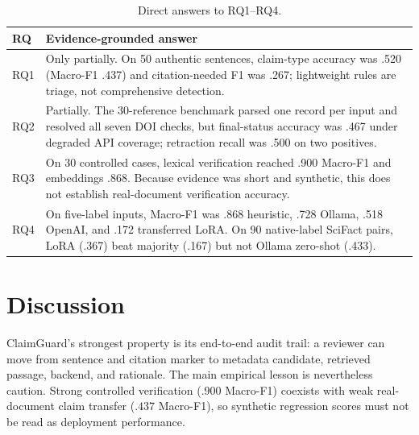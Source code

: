 \documentclass[12pt,toc=bib,toc=listof]{scrartcl}
\begin{document}
\begin{table}[H]
\centering
\scriptsize
\begin{tabularx}{\textwidth}{@{}P{1cm}Y@{}}
\toprule
\textbf{RQ} & \textbf{Evidence-grounded answer} \\
\midrule
RQ1 & Only partially. On 50 authentic sentences, claim-type accuracy was .520 (Macro-F1 .437) and citation-needed F1 was .267; lightweight rules are triage, not comprehensive detection. \\
RQ2 & Partially. The 30-reference benchmark parsed one record per input and resolved all seven DOI checks, but final-status accuracy was .467 under degraded API coverage; retraction recall was .500 on two positives. \\
RQ3 & On 30 controlled cases, lexical verification reached .900 Macro-F1 and embeddings .868. Because evidence was short and synthetic, this does not establish real-document verification accuracy. \\
RQ4 & On five-label inputs, Macro-F1 was .868 heuristic, .728 Ollama, .518 OpenAI, and .172 transferred LoRA. On 90 native-label SciFact pairs, LoRA (.367) beat majority (.167) but not Ollama zero-shot (.433). \\
\bottomrule
\end{tabularx}
\caption{Direct answers to RQ1--RQ4.}
\label{tab:rq_answers}
\end{table}

\section{Discussion}

ClaimGuard's strongest property is its end-to-end audit trail: a reviewer can move from sentence and citation marker to metadata candidate, retrieved passage, backend, and rationale. The main empirical lesson is nevertheless caution. Strong controlled verification ($.900$ Macro-F1) coexists with weak real-document claim transfer ($.437$ Macro-F1), so synthetic regression scores must not be read as deployment performance.
\end{document}

